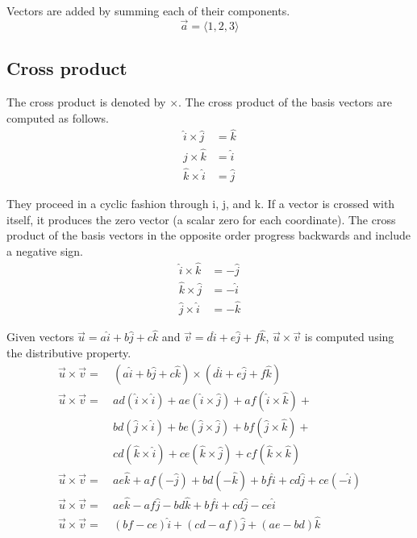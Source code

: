 Vectors are added by summing each of their components.
\begin{equation*}
  \vec{a} = \langle 1, 2, 3 \rangle
\end{equation*}

\subsection{Cross product}

The cross product is denoted by $\times$. The cross product of the basis vectors
are computed as follows.
\begin{align*}
  \hat{i} \times \hat{j} &= \hat{k} \\
  \hat{j} \times \hat{k} &= \hat{i} \\
  \hat{k} \times \hat{i} &= \hat{j}
\end{align*}

They proceed in a cyclic fashion through i, j, and k. If a vector is crossed
with itself, it produces the zero vector (a scalar zero for each coordinate).
The cross product of the basis vectors in the opposite order progress backwards
and include a negative sign.
\begin{align*}
  \hat{i} \times \hat{k} &= -\hat{j} \\
  \hat{k} \times \hat{j} &= -\hat{i} \\
  \hat{j} \times \hat{i} &= -\hat{k}
\end{align*}

Given vectors
$\vec{u} = a\hat{i} + b\hat{j} + c\hat{k}$ and
$\vec{v} = d\hat{i} + e\hat{j} + f\hat{k}$, $\vec{u} \times \vec{v}$ is computed
using the distributive property.
\begin{align*}
  \vec{u} \times \vec{v} =&~(a\hat{i} + b\hat{j} + c\hat{k}) \times
    (d\hat{i} + e\hat{j} + f\hat{k}) \\
  \vec{u} \times \vec{v} =&~ad(\hat{i} \times \hat{i}) + ae(\hat{i} \times
    \hat{j}) + af(\hat{i} \times \hat{k}) + \\
    &~bd(\hat{j} \times \hat{i}) + be(\hat{j} \times \hat{j}) +
    bf(\hat{j} \times \hat{k}) + \\
    &~cd(\hat{k} \times \hat{i}) + ce(\hat{k} \times \hat{j}) +
    cf(\hat{k} \times \hat{k}) \\
  \vec{u} \times \vec{v} =&~ae\hat{k} + af(-\hat{j}) + bd(-\hat{k}) +
    bf\hat{i} + cd\hat{j} + ce(-\hat{i}) \\
  \vec{u} \times \vec{v} =&~ae\hat{k} - af\hat{j} - bd\hat{k} + bf\hat{i} +
    cd\hat{j} - ce\hat{i} \\
  \vec{u} \times \vec{v} =&~(bf - ce)\hat{i} + (cd - af)\hat{j} +
    (ae - bd)\hat{k}
\end{align*}
